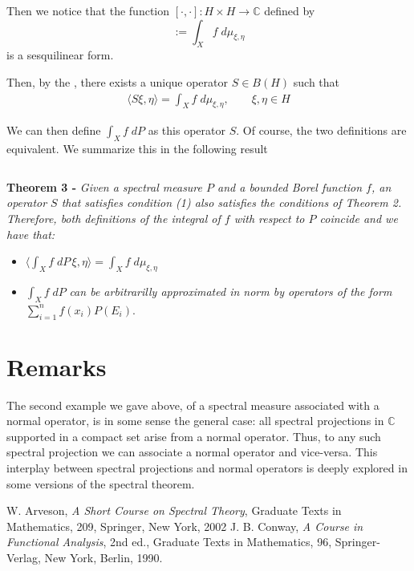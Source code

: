 \documentclass[12pt]{article}
\begin{document}
Then we notice that the function $[\cdot,\cdot] : H \times H \longrightarrow \mathbb{C}$ defined by
\begin{displaymath}
[\xi, \eta] :=\int_X f\; d\mu_{\xi, \eta}
\end{displaymath}
is a  sesquilinear form.

Then, by the , there exists a unique operator $S \in B(H)$ such that
\begin{align}
\langle S \xi, \eta \rangle = \int_X f\; d\mu_{\xi, \eta}, \quad\quad \xi, \eta \in H
\end{align}

We can then define $\displaystyle \int_X f \;dP$ as this operator $S$. Of course, the two definitions are equivalent. We summarize this in the following result

$\,$

{\bf Theorem 3 -} \emph{Given a spectral measure $P$ and a bounded Borel function $f$, an operator $S$ that satisfies condition (1) also satisfies the conditions of Theorem 2. Therefore, both definitions of the integral of $f$ with respect to $P$ coincide and we have that:}
\begin{itemize}
\item $\displaystyle \big\langle \int_X f\; dP\, \xi, \eta \big\rangle = \int_X f \;d \mu_{\xi, \eta}$
\item $\displaystyle \int_X f\; dP$ \emph{can be arbitrarilly approximated in norm by operators of the form} $\displaystyle \sum_{i=1}^n f(x_i)P(E_i)$.
\end{itemize}


\section{Remarks}

The second example we gave above, of a spectral measure associated with a normal operator, is in some sense the general case: all spectral projections in $\mathbb{C}$ supported in a compact set arise from a normal operator. Thus, to any such spectral projection we can associate a normal operator and vice-versa. This interplay between spectral projections and normal operators is deeply explored in some versions of the spectral theorem.

\begin{thebibliography}{9}
 W. Arveson, \emph{A Short Course on Spectral Theory}, Graduate Texts in Mathematics, 209, Springer, New York, 2002
 J. B. Conway, \emph{A Course in Functional Analysis}, 2nd ed., Graduate Texts in Mathematics, 96, Springer-Verlag, New York, Berlin, 1990.
\end{thebibliography}
\end{document}
